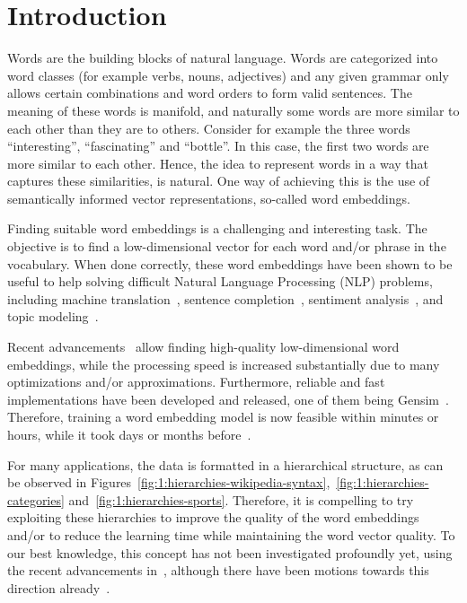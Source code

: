 \chapter{Introduction}

Words are the building blocks of natural language. Words are categorized into word classes (for example verbs, nouns, adjectives) and any given grammar only allows certain combinations and word orders to form valid sentences. The meaning of these words is manifold, and naturally some words are more similar to each other than they are to others. Consider for example the three words ``interesting'', ``fascinating'' and ``bottle''. In this case, the first two words are more similar to each other.
Hence, the idea to represent words in a way that captures these similarities, is natural. One way of achieving this is the use of semantically informed vector representations, so-called word embeddings.

Finding suitable word embeddings is a challenging and interesting task. The objective is to find a low-dimensional vector for each word and/or phrase in the vocabulary. When done correctly, these word embeddings have been shown to be useful to help solving difficult Natural Language Processing (NLP) problems, including machine translation~\cite{Mikolov2013b, Wolf2013}, sentence completion~\cite{Mikolov2013a}, sentiment analysis~\cite{Hong}, and topic modeling~\cite{Jameel2013}.

Recent advancements~\cite{Mikolov2013a, Mikolov2013} allow finding high-quality low-dimensional word embeddings, while the processing speed is increased substantially due to many optimizations and/or approximations. Furthermore, reliable and fast implementations have been developed and released, one of them being Gensim~\cite{rehurek_lrec}. Therefore, training a word embedding model is now feasible within minutes or hours, while it took days or months before~\cite{Mikolov2013}.

For many applications, the data is formatted in a hierarchical structure, as can be observed in Figures~\ref{fig:1:hierarchies-wikipedia-syntax},~\ref{fig:1:hierarchies-categories} and~\ref{fig:1:hierarchies-sports}. Therefore, it is compelling to try exploiting these hierarchies to improve the quality of the word embeddings and/or to reduce the learning time while maintaining the word vector quality. To our best knowledge, this concept has not been investigated profoundly yet, using the recent advancements in~\cite{Mikolov2013}, although there have been motions towards this direction already~\cite{Fu2014}.

